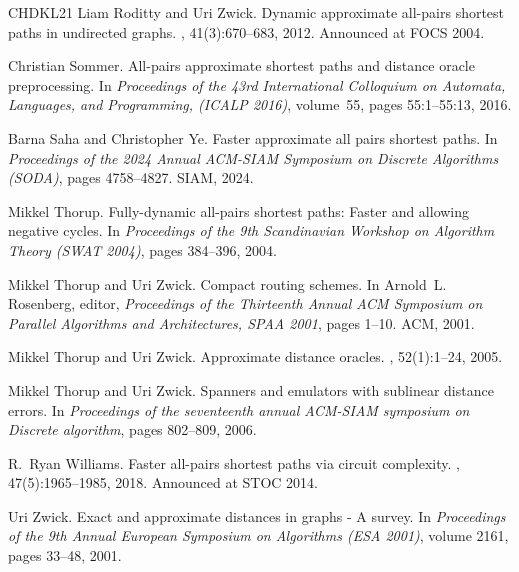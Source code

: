 \documentclass[11pt]{article}
\theoremstyle{definition}
\theoremstyle{remark}
\begin{document}
\begin{thebibliography}{CHDKL21}
Liam Roditty and Uri Zwick.
\newblock Dynamic approximate all-pairs shortest paths in undirected graphs.
, 41(3):670--683, 2012.
\newblock Announced at {FOCS} 2004.

Christian Sommer.
\newblock All-pairs approximate shortest paths and distance oracle
  preprocessing.
\newblock In {\em Proceedings of the 43rd International Colloquium on Automata,
  Languages, and Programming, ({ICALP} 2016)}, volume~55, pages 55:1--55:13,
  2016.

Barna Saha and Christopher Ye.
\newblock Faster approximate all pairs shortest paths.
\newblock In {\em Proceedings of the 2024 Annual ACM-SIAM Symposium on Discrete
  Algorithms (SODA)}, pages 4758--4827. SIAM, 2024.

Mikkel Thorup.
\newblock Fully-dynamic all-pairs shortest paths: Faster and allowing negative
  cycles.
\newblock In {\em Proceedings of the 9th Scandinavian Workshop on Algorithm
  Theory ({SWAT} 2004)}, pages 384--396, 2004.

Mikkel Thorup and Uri Zwick.
\newblock Compact routing schemes.
\newblock In Arnold~L. Rosenberg, editor, {\em Proceedings of the Thirteenth
  Annual {ACM} Symposium on Parallel Algorithms and Architectures, {SPAA}
  2001}, pages 1--10. {ACM}, 2001.

Mikkel Thorup and Uri Zwick.
\newblock Approximate distance oracles.
, 52(1):1--24, 2005.

Mikkel Thorup and Uri Zwick.
\newblock Spanners and emulators with sublinear distance errors.
\newblock In {\em Proceedings of the seventeenth annual ACM-SIAM symposium on
  Discrete algorithm}, pages 802--809, 2006.

R.~Ryan Williams.
\newblock Faster all-pairs shortest paths via circuit complexity.
, 47(5):1965--1985, 2018.
\newblock Announced at {STOC} 2014.

Uri Zwick.
\newblock Exact and approximate distances in graphs - {A} survey.
\newblock In {\em Proceedings of the 9th Annual European Symposium on
  Algorithms ({ESA} 2001)}, volume 2161, pages 33--48, 2001.

\end{thebibliography}
\end{document}
